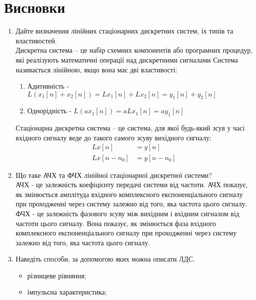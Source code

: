 \section{Висновки}
\label{sec:summary}

\begin{enumerate}
      \item Дайте визначення лінійних стаціонарних дискретних систем, їх типів
            та властивостей. \\
            Дискретна система – це набір схемних компонентів або програмних процедур,
            які реалізують математичні операції над дискретними сигналами
            Система називається лінійною, якщо вона має дві властивості:
            \begin{enumerate}
                  \item Адитивність - $L(x_1[n] + x_2[n]) = Lx_1[n] + Lx_2[n] = y_1[n] + y_2[n]$
                  \item Однорідність - $L(ax_1[n]) = aLx_1[n] = ay_1[n]$
            \end{enumerate}
            Стаціонарна дискретна система – це система, для якої будь-який зсув у часі
            вхідного сигналу веде до такого самого зсуву вихідного сигналу:
            \begin{align}
                  Lx[n]       & = y[n]       \\
                  Lx[n - n_0] & = y[n - n_0]
            \end{align}
      \item Що таке АЧХ та ФЧХ лінійної стаціонарної дискретної системи? \\
            АЧХ - це залежність коефіцієнту передачі системи від частоти.
            АЧХ показує, як змінюється амплітуда вхідного комплексного
            експоненціального сигналу при проходженні
            через систему залежно від того, яка частота цього сигналу. \\
            ФЧХ - це залежність фазового зсуву між вихідним і вхідним сигналом від
            частоти цього сигналу. Вона показує, як змінюється фаза вхідного
            комплексного експоненціального сигналу при проходженні через систему
            залежно від того, яка частота цього сигналу.
      \item Наведіть способи, за допомогою яких можна описати ЛДС.
            \begin{itemize}
                  \item різницеве рівняння;
                  \item імпульсна характеристика;

\end{itemize}
\end{enumerate}

